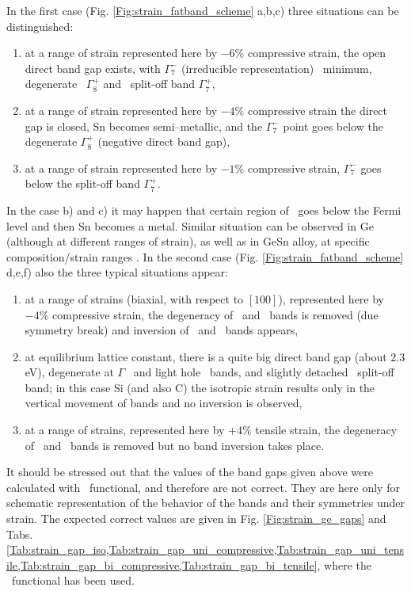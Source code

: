 In the first case (Fig. \ref{Fig:strain_fatband_scheme} a,b,c) three situations can be distinguished:
\begin{enumerate}
    \item[a)] at a range of strain represented here by $-6\%$ compressive strain, the open direct band gap exists, with $\Gamma_7^-$ (irreducible representation) \CB\ minimum, degenerate \VBM\ $\Gamma_8^+$ and \SO\ split-off band $\Gamma_7^+$,
    \item[b)] at a range of strain represented here by $-4\%$ compressive strain the direct gap is closed, Sn becomes semi--metallic, and the $\Gamma_7^-$ point goes below the degenerate $\Gamma_8^+$ (negative direct band gap),
    \item[c)] at a range of strain represented here by $-1\%$ compressive strain, $\Gamma_7^-$ goes below the split-off band $\Gamma_7^+$.
\end{enumerate}

In the case b) and c) it may happen that certain region of \CB\ goes below the Fermi level and then Sn becomes a metal.
Similar situation can be observed in Ge (although at different ranges of strain), as well as in GeSn alloy, at specific composition/strain ranges \cite{Polak.2017}.
In the second case (Fig. \ref{Fig:strain_fatband_scheme} d,e,f) also the three typical situations appear:
\begin{enumerate}
    \item[d)] at a range of strains (biaxial, with respect to $[100]$), represented here by $-4\%$ compressive strain, the degeneracy of \HH\ and \LH\ bands is removed (due symmetry break) and inversion of \HH\ and \LH\ bands appears,
    \item[e)] at equilibrium lattice constant, there is a quite big direct band gap (about $2.3$ eV), degenerate at $\Gamma$ \HH\ and light hole \LH\ bands, and slightly detached \SO\ split-off band; in this case Si (and also C) the isotropic strain results only in the vertical movement of bands and no inversion is observed,
    \item[f)] at a range of strains, represented here by $+4\%$ tensile strain, the degeneracy of \HH\ and \LH\ bands is removed but no band inversion takes place.
\end{enumerate}

It should be stressed out that the values of the band gaps given above were calculated with \LDA\ functional, and therefore are not correct.
They are here only for schematic representation of the behavior of the bands and their symmetries under strain.
The expected correct values are given in Fig. \ref{Fig:strain_ge_gaps} and Tabs. \cref{Tab:strain_gap_iso,Tab:strain_gap_uni_compressive,Tab:strain_gap_uni_tensile,Tab:strain_gap_bi_compressive,Tab:strain_gap_bi_tensile}, where the \mBJLDA\ functional has been used.

